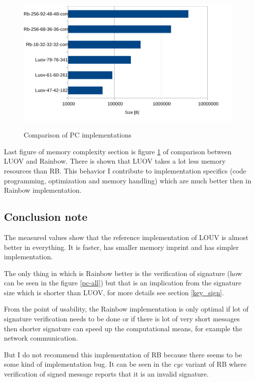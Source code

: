 \documentclass[thesis=M,english]{FITthesis}[2019/12/23]
\begin{document}
\begin{figure}[H]
\centering
\includegraphics[width=13cm,height=7cm]{images/mem-pc-all.pdf}
\caption{Comparison of PC implementations}
\label{mem-pc-all}
\end{figure}

\noindent
Last figure of memory complexity section is figure \ref{mem-pc-all} of comparison between LUOV and Rainbow. There is shown that LUOV takes a lot less memory resources than RB.  This behavior I contribute to implementation specifics (code programming, optimization and memory handling) which are much better then in Rainbow implementation.

\subsection{Conclusion note}
The measured values show that the reference implementation of LOUV is almost better in everything. It is faster, has smaller memory imprint and has simpler implementation.

\bigskip
\noindent
The only thing in which is Rainbow better is the verification of signature (how can be seen in the figure \ref{pc-all}) but that is an implication from the signature size which is shorter than LUOV, for more details see section \ref{key_sign}.

\bigskip
\noindent
From the point of usability, the Rainbow implementation is only optimal if lot of signature verification needs to be done or if there is lot of very short messages then shorter signature can speed up the computational means, for example the network communication.

\bigskip
\noindent
But I do not recommend this implementation of RB because there seems to be some kind of implementation bug. It can be seen in the \textit{cyc} variant of RB where verification of signed message reports that it is an invalid signature.
\end{document}
